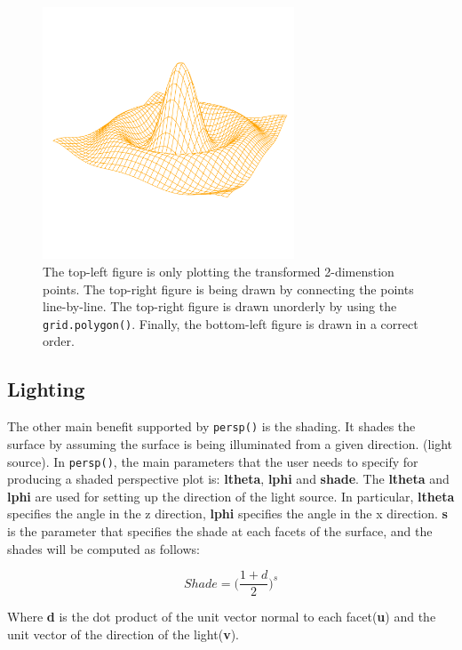 \documentclass[11pt,twoside]{report}
\begin{document}
\begin{figure}[h]
\begin{center}
		\includegraphics[height = 7.5cm, width = 7.5cm]{figure/standalone_p_4.pdf}
		\caption{The top-left figure is only plotting the transformed 2-dimenstion points. The top-right figure is being drawn by connecting the points line-by-line. The top-right figure is drawn unorderly by using the \texttt{grid.polygon()}. Finally, the bottom-left figure is drawn in a correct order.}
		\label{figure_3.2}
	\end{center}
\end{figure}

\subsection{Lighting}
The other main benefit supported by \texttt{persp()} is the shading. It shades the surface by assuming the surface is being illuminated from a given direction. (light source). In \texttt{persp()}, the main parameters that the user needs to specify for producing a shaded perspective plot is: \textbf{ltheta}, \textbf{lphi} and \textbf{shade}. The \textbf{ltheta} and \textbf{lphi} are used for setting up the direction of the light source. In particular, \textbf{ltheta} specifies the angle in the z direction, \textbf{lphi} specifies the angle in the x direction. \textbf{s} is the parameter that specifies the shade at each facets of the surface, and the shades will be computed as follows:

\begin{equation}
Shade = \big(\frac{1 + d}{2}\big)^{s}
\end{equation}

Where \textbf{d} is the dot product of the unit vector normal to each facet(\textbf{u}) and the unit vector of the direction of the light(\textbf{v}). \\
\end{document}
